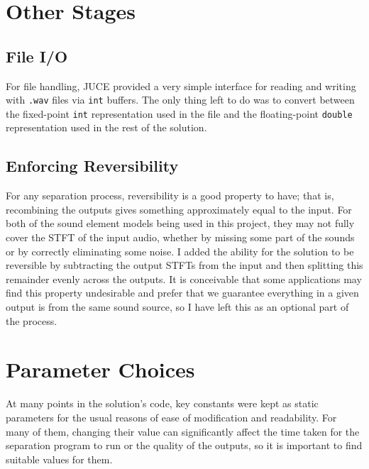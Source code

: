 \documentclass[12pt,a4paper,twoside,openright]{report}
\begin{document}
{\color{red}\section{Other Stages}

\subsection{File I/O}}

For file handling, JUCE provided a very simple interface for reading and writing with \texttt{.wav} files via \texttt{int} buffers. The only thing left to do was to convert between the fixed-point \texttt{int} representation used in the file and the floating-point \texttt{double} representation used in the rest of the solution.

{\color{red}\subsection{Enforcing Reversibility}}

For any separation process, reversibility is a good property to have; that is, recombining the outputs gives something approximately equal to the input. For both of the sound element models being used in this project, they may not fully cover the STFT of the input audio, whether by missing some part of the sounds or by correctly eliminating some noise. I added the ability for the solution to be reversible by subtracting the output STFTs from the input and then splitting this remainder evenly across the outputs. It is conceivable that some applications may find this property undesirable and prefer that we guarantee everything in a given output is from the same sound source, so I have left this as an optional part of the process.

\section{Parameter Choices}

At many points in the solution's code, key constants were kept as static parameters for the usual reasons of ease of modification and readability. For many of them, changing their value can significantly affect the time taken for the separation program to run or the quality of the outputs, so it is important to find suitable values for them.
\end{document}
